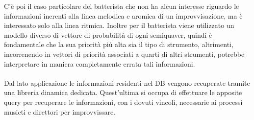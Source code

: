 C'è poi il caso particolare del batterista
che non ha alcun interesse riguardo le informazioni inerenti alla linea melodica 
e aromica di un improvvisazione, ma è interessato solo alla linea ritmica. Inoltre
per il batterista viene utilizzato un modello diverso di vettore di probabilità 
di ogni semiquaver, quindi è fondamentale che la sua priorità più alta sia il tipo 
di strumento, altrimenti, incorrenendo in vettori di priorità associati a quarti di
altri strumenti, potrebbe interpretare in maniera completamente errata tali informazioni.\\\\
Dal lato applicazione le informazioni residenti nel DB vengono recuperate tramite
una libreria dinamica dedicata. Quest'ultima si occupa di effettuare le apposite
query per recuperare le informazioni, con i dovuti vincoli, necessarie ai processi 
musicti e direttori per improvvissare.
